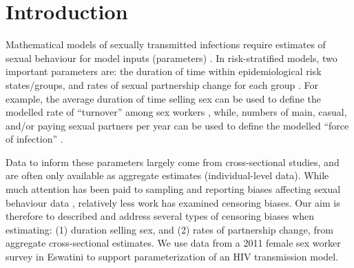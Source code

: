 \section{Introduction}
Mathematical models of sexually transmitted infections require
estimates of sexual behaviour for model inputs (parameters) \cite{Garnett2002}.
In risk-stratified models, two important parameters are:
the duration of time within epidemiological risk states/groups, and
rates of sexual partnership change for each group
\cite{Garnett1996,Stigum1997,Watts2010,Knight2020}.
For example, the average duration of time selling sex can be used to define
the modelled rate of ``turnover'' among sex workers \cite{Knight2020},
while, numbers of main, casual, and/or paying sexual partners per year
can be used to define the modelled ``force of infection'' \cite{Boily2015}.
\par
Data to inform these parameters largely come from cross-sectional studies,
and are often only available as aggregate estimates (\vs individual-level data).
While much attention has been paid to
sampling and reporting biases affecting sexual behaviour data \cite{Fenton2001},
relatively less work has examined censoring biases.
Our aim is therefore to described and address
several types of censoring biases when estimating:
(1) duration selling sex, and (2) rates of partnership change,
from aggregate cross-sectional estimates.
We use data from a 2011 female sex worker survey in Eswatini \cite{Yam2013}
to support parameterization of an HIV transmission model.
